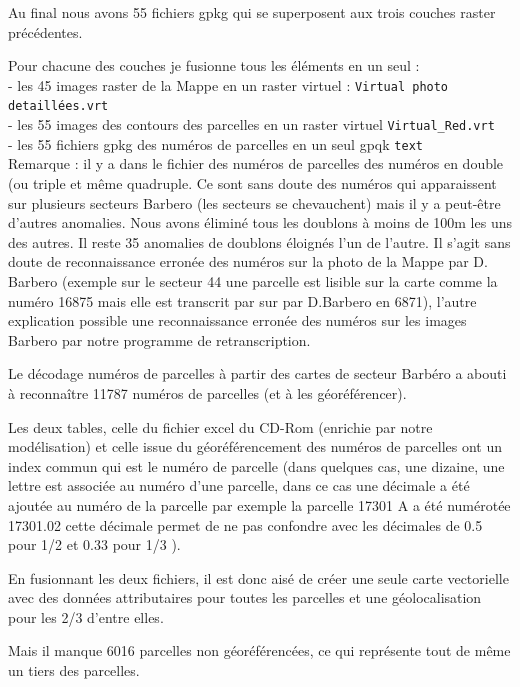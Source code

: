 Au final nous avons 55 fichiers gpkg qui se superposent aux trois couches raster précédentes.

Pour chacune des couches je fusionne tous les éléments en un seul :\\
- les 45 images raster de la Mappe en un raster virtuel : \texttt{Virtual photo detaillées.vrt} \\
- les 55 images des contours des parcelles en un raster virtuel \texttt{Virtual_Red.vrt}\\
- les 55 fichiers gpkg des numéros de parcelles en un seul gpqk  \texttt{text}\\

Remarque : il y a dans le fichier des numéros de parcelles des numéros en double (ou triple et même quadruple. Ce sont sans doute des numéros qui apparaissent sur plusieurs secteurs Barbero (les secteurs se chevauchent) mais il y a peut-être d'autres anomalies. Nous avons éliminé tous les doublons à moins de 100m les uns des autres. Il reste 35 anomalies de doublons éloignés l'un de l'autre. Il s'agit sans doute de reconnaissance erronée des numéros sur la photo de la Mappe par D. Barbero (exemple sur le secteur 44 une parcelle est lisible sur la carte comme la numéro 16875 mais elle est transcrit par sur par D.Barbero en 6871), l'autre explication possible une reconnaissance erronée des numéros sur les images Barbero par notre programme de retranscription.




Le décodage numéros de parcelles à partir des cartes de secteur Barbéro a abouti à reconnaître 11787 numéros de parcelles (et à les géoréférencer).

Les deux tables, celle du fichier excel du CD-Rom (enrichie par notre modélisation) et celle issue du géoréférencement des numéros de parcelles ont un index commun qui est le numéro de parcelle (dans quelques cas, une dizaine, une lettre est associée au numéro d'une parcelle, dans ce cas une décimale a été ajoutée au numéro de la parcelle par exemple la parcelle 17301 A a été numérotée 17301.02 cette décimale permet de ne pas confondre avec les décimales de 0.5 pour 1/2 et 0.33 pour 1/3 ). 

En fusionnant les deux fichiers, il est donc aisé de créer une seule carte vectorielle avec des données attributaires pour toutes les parcelles et une géolocalisation pour les 2/3 d'entre elles.

Mais il manque 6016 parcelles non géoréférencées, ce qui représente tout de même un tiers des parcelles.

